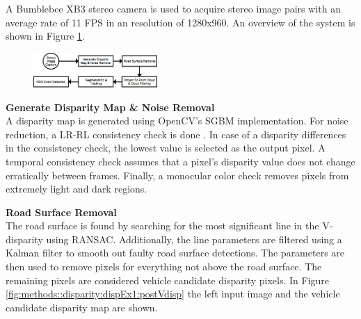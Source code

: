 \begin{multicols}{2}   

A Bumblebee XB3 stereo camera is used to acquire stereo image pairs with an average rate of 11 FPS in an resolution of 1280x960. An overview of the system is shown in Figure \ref{systemOverview::systemOverview}.

\begin{figure}[H]
  \centering
  \includegraphics[width=0.42\textwidth]{text/figures/systemForeslag4.png}
  \label{systemOverview::systemOverview}
\end{figure}


\textbf{Generate Disparity Map \& Noise Removal}\\
A disparity map is generated using OpenCV's SGBM implementation. For noise reduction, a LR-RL consistency check is done \cite{HirschmullerRLandSGBM}. In case of a disparity differences in the consistency check, the lowest value is selected as the output pixel. A temporal consistency check assumes that a pixel's disparity value does not change erratically between frames. Finally, a monocular color check removes pixels from extremely light and dark regions.

\textbf{Road Surface Removal}\\
The road surface is found by searching for the most significant line in the V-disparity\cite{labayrade2002real} using RANSAC. Additionally, the line parameters are filtered using a Kalman filter to smooth out faulty road surface detections. The parameters are then used to remove pixels for everything not above the road surface. The remaining pixels are considered vehicle candidate disparity pixels. In Figure \ref{fig:methods::disparity:dispEx1:postVdisp} the left input image and the vehicle candidate disparity map are shown.


\end{multicols}
